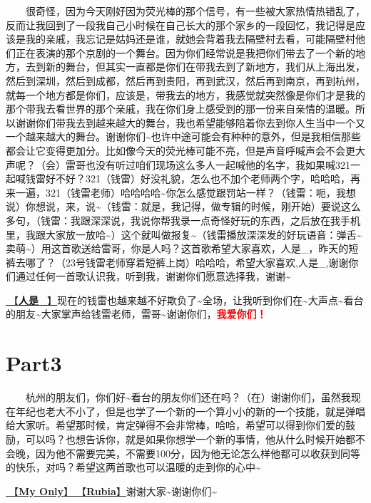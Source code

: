 \documentclass[]{ctexbook}
\begin{document}
  很奇怪，因为今天刚好因为荧光棒的那个信号，有一些被大家热情热错乱了，反而让我回到了一段我自己小时候在自己长大的那个家乡的一段回忆，我记得是应该是我的亲戚，我忘记是姑妈还是谁，就她会背着我去隔壁村去看，可能隔壁村他们正在表演的那个京剧的一个舞台。因为你们经常说是我把你们带去了一个新的地方，去到新的舞台，但其实一直都是你们在带我去到了新地方，我们从上海出发，然后到深圳，然后到成都，然后再到贵阳，再到武汉，然后再到南京，再到杭州，就每一个地方都是你们，应该是，带我去的地方，我感觉就突然像是你们才是我的那个带我去看世界的那个亲戚，我在你们身上感受到的那一份来自亲情的温暖。所以谢谢你们带我去到越来越大的舞台，我也希望能够陪着你去到你人生当中一个又一个越来越大的舞台。谢谢你们\textasciitilde 也许中途可能会有种种的意外，但是我相信那些都会让它变得更加分。比如像今天的荧光棒可能不亮，但是声音呼喊声会不会更大声呢？（会）雷哥也没有听过咱们现场这么多人一起喊他的名字，我如果喊321一起喊钱雷好不好？321（钱雷）好没礼貌，怎么也不加个老师两个字，哈哈哈，再来一遍，321（钱雷老师）哈哈哈哈\textasciitilde 你怎么感觉跟罚站一样？（钱雷：呃，我想说）你想说，来，说\textasciitilde（钱雷：就是，我记得，做专辑的时候，刚开始）要说这么多句，（钱雷：我跟深深说，我说你帮我录一点奇怪好玩的东西，之后放在我手机里，我跟大家放一放哈\textasciitilde）这个就叫做报复\textasciitilde（钱雷播放深深发的好玩语音：弹舌\textasciitilde 卖萌\textasciitilde）用这首歌送给雷哥，你是人吗？这首歌希望大家喜欢，人是\_，昨天的短裤去哪了？（23号钱雷老师穿着短裤上岗）哈哈哈，希望大家喜欢,人是\_,谢谢你们通过任何一首歌认识我，听到我，谢谢你们愿意选择我，谢谢\textasciitilde{}

\hyperref[renshi]{🎵【\textbf{人是\_}】}现在的钱雷也越来越不好欺负了\textasciitilde 全场，让我听到你们在\textasciitilde 大声点\textasciitilde 看台的朋友\textasciitilde 大家掌声给钱雷老师，雷哥\textasciitilde 谢谢你们，\textbf{\textcolor{red}{我爱你们！}}

\section{Part3}\label{hangzhou-20240824-part3}

  杭州的朋友们，你们好\textasciitilde 看台的朋友你们还在吗？（在）谢谢你们，虽然我现在年纪也老大不小了，但是也学了一个新的一个算小小的新的一个技能，就是弹唱给大家听。希望那时候，肯定弹得不会非常棒，哈哈，希望可以得到你们爱的鼓励，可以吗？也想告诉你，就是如果你想学一个新的事情，他从什么时候开始都不会晚，因为他不需要完美，不需要100分，因为他无论怎么样他都可以收获到同等的快乐，对吗？希望这两首歌也可以温暖的走到你的心中\textasciitilde{}

\hyperref[my-only]{🎵【\textbf{My Only}】}\hyperref[rubia]{🎵【\textbf{Rubia}】}谢谢大家\textasciitilde 谢谢你们\textasciitilde{}
\end{document}
